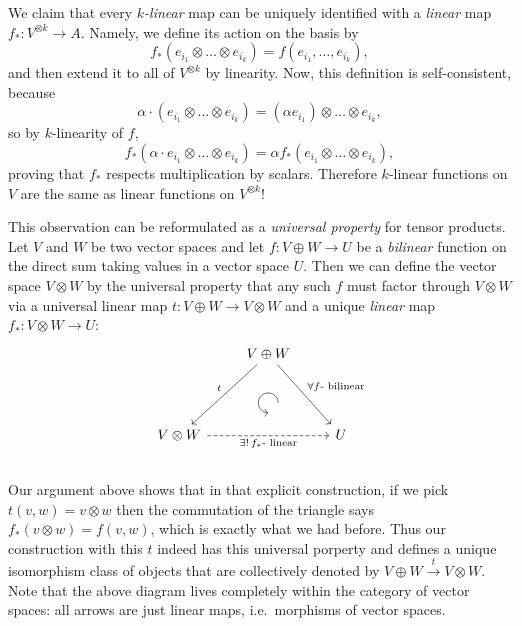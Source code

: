 \documentclass[english,letterpaper]{article}%
\numberwithin{equation}{section}
\numberwithin{figure}{section}
\numberwithin{table}{section}
\theoremstyle{definition}
\theoremstyle{definition}
\theoremstyle{definition}
\theoremstyle{plain}
\theoremstyle{plain}
\theoremstyle{plain}
\theoremstyle{plain}
\theoremstyle{remark}
\theoremstyle{remark}
\begin{document}
\begin{example}
We claim that every \emph{$k$-linear} map can be uniquely identified
with a \emph{linear} map $f_{\ast}:V^{\otimes k}\to A$. Namely,
we define its action on the basis by
\begin{equation}
f_{\ast}\left(e_{i_{1}}\otimes\ldots\otimes e_{i_{k}}\right)=f\left(e_{i_{1}},\ldots,e_{i_{k}}\right),
\end{equation}
and then extend it to all of $V^{\otimes k}$ by linearity. Now, this
definition is self-consistent, because
\begin{equation}
\alpha\cdot\left(e_{i_{1}}\otimes\ldots\otimes e_{i_{k}}\right)=\left(\alpha e_{i_{1}}\right)\otimes\ldots\otimes e_{i_{k}},
\end{equation}
so by $k$-linearity of $f$, 
\[
f_{\ast}\left(\alpha\cdot e_{i_{1}}\otimes\ldots\otimes e_{i_{k}}\right)=\alpha f_{\ast}\left(e_{i_{1}}\otimes\ldots\otimes e_{i_{k}}\right),
\]
proving that $f_{\ast}$ respects multiplication by scalars. Therefore
$k$-linear functions on $V$ are the same as linear functions on
$V^{\otimes k}$! 

This observation can be reformulated as a \emph{universal property} for tensor products. Let $V$ and $W$ be two vector spaces and let $f:V\oplus W\to U$ be a \emph{bilinear} function on the direct sum taking values in a vector space $U$. Then we can define the vector space $V\otimes W$ by the universal property that any such $f$ must factor through $V\otimes W$ via a universal linear map $t:V\oplus W\to V\otimes W$ and a unique \emph{linear} map $f_\ast:V\otimes W\to U$:
\[\begin{tikzcd}[every matrix/.append style={name=m},   
execute at end picture={\draw [<-] ([xshift=0mm,yshift=-6mm]m-2-2.north) arc[start angle=-90,delta angle=-270,radius=0.25cm];}]
   & V\oplus W\arrow[ddl,swap,"t" ]\arrow[ddr,"\forall f\text{- bilinear}"] & \\
   & \, & \\
   V\otimes W \arrow[rr,dashed,swap,"\exists!\,f_\ast\text{- linear}"]& & U\\
\end{tikzcd}\]
Our argument above shows that in that explicit construction, if we pick $t(v,w)=v\otimes w$ then the commutation of the triangle says $f_\ast (v\otimes w)=f(v,w)$, which is exactly what we had before. Thus our construction with this $t$ indeed has this universal porperty and defines a unique isomorphism class of objects that are collectively denoted by  $V\oplus W\overset{t}{\to}V\otimes W $. Note that the above diagram lives completely within the category of vector spaces: all arrows are just linear maps, i.e.\ morphisms of vector spaces.


\end{example}
\end{document}
